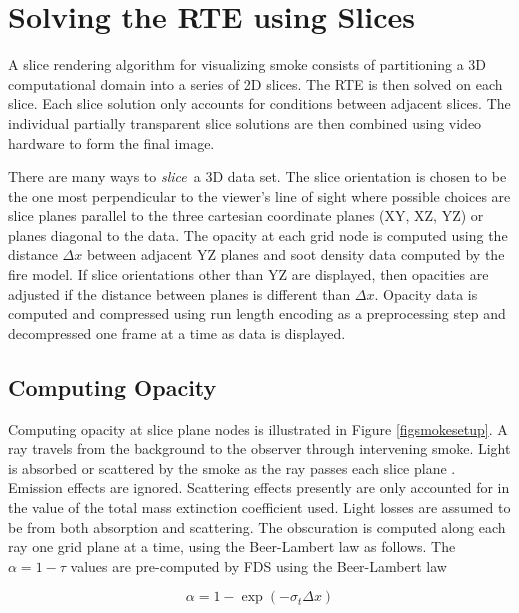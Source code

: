 %
%

\section{Solving the RTE using Slices}
A slice rendering algorithm for visualizing smoke consists of partitioning a 3D computational domain into a series of 2D slices.  The RTE is then solved on each slice.  Each slice solution only accounts for conditions between adjacent slices.  The individual partially transparent slice solutions are then combined using video hardware to form the final image.
 
There are many ways to {\em slice}\ a 3D data set.  The slice orientation is chosen to be the one most perpendicular to the viewer's line of sight where possible choices are slice planes parallel to the three cartesian coordinate planes (XY, XZ, YZ) or planes diagonal to the data.  The opacity at each grid node is computed using the distance $\Delta x$ between adjacent YZ planes and soot density data computed by the fire model.  If slice orientations other than YZ are displayed, then opacities are adjusted if the distance between planes is different than $\Delta x$.  Opacity data is computed and compressed using run length encoding as a preprocessing step and decompressed one frame at a time as data is displayed.


%
%

\subsection{Computing Opacity}
Computing opacity at slice plane nodes is illustrated in Figure \ref{figsmokesetup}. A ray travels from the background to the observer through intervening smoke. Light is absorbed or scattered by the smoke as the ray passes each slice plane .  Emission effects are ignored. Scattering effects presently are only accounted for in the value of the total mass extinction coefficient used.  Light losses are assumed to be from both absorption and scattering. The obscuration is computed along each ray one grid plane at a time, using the Beer-Lambert law as follows.  The $\alpha=1-\tau$ values are pre-computed by FDS using the Beer-Lambert law~\cite{Siegel:2001}

\begin{equation}
\alpha=1-\exp(-\sigma_t\Delta x) \label{eq:alpha}
\end{equation}

